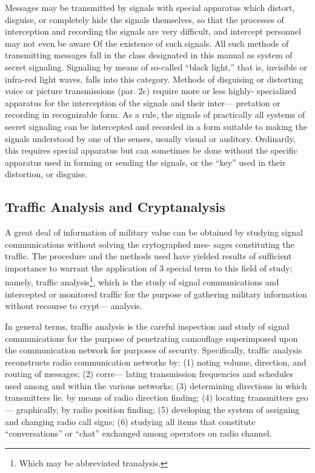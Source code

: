 \mypara Messages may be transmitted by signals with special apparatus
which distort, disguise, or completely hide the signals themselves, so that
the processes of interception and recording the signals are very difficult,
and intercept personnel may not even be aware Of the existence of such
signals. All such methods of transmitting messages fall in the class
designated in this manual as system of secret signaling. Signaling by
means of so-called “black light,” that is, invisible or infra-red light
waves, falls into this category. Methods of disguising or distorting
voice or picture transmissions (par. 2c) require more or less highly-
specialized apparatus for the interception of the signals and their inter—
pretation or recording in recognizable form. As a rule, the signals of
practically all systems of secret signaling can be intercepted and recorded
in a form suitable to making the signals understood by one of the senses,
usually visual or auditory. Ordinarily, this requires special apparatus
but can sometimes be done without the speciﬁc apparatus used in forming
or sending the signals, or the “key” used in their distortion, or disguise.

\subsection{Traffic Analysis and Cryptanalysis}

\mypara A great deal of information of military value can be obtained by
studying signal communications without solving the crytographed mes-
sages constituting the trafﬁc. The procedure and the methods used have
yielded results of sufﬁcient importance to warrant the application of 3
special term to this ﬁeld of study; namely, traffic analysis\footnote{ Which may be abbreviated tranalysis.  }, which is the
study of signal communications and intercepted or monitored trafﬁc for
the purpose of gathering military information without recourse to crypt—
analysis.

\mypara In general terms, trafﬁc analysis is the careful inspection and study
of signal communications for the purpose of penetrating camouﬂage
superimposed upon the communication network for purposes of security.
Speciﬁcally, trafﬁc analysis reconstructs radio communication networks
by: (1) noting volume, direction, and routing of messages; (2) corre—
lating transmission frequencies and schedules used among and within the
various networks; (3) determining directions in which transmitters lie.
by means of radio direction ﬁnding; (4) locating transmitters geo—
graphically, by radio position ﬁnding; (5) developing the system of
assigning and changing radio call signs; (6) studying all items that
constitute “conversations” or “chat” exchanged among operators on
radio channel.

